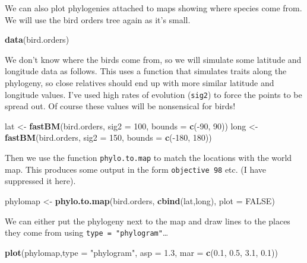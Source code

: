 \documentclass[]{book}
\newenvironment{Shaded}{\begin{snugshade}}{\end{snugshade}}
\newcommand{\KeywordTok}[1]{\textcolor[rgb]{0.13,0.29,0.53}{\textbf{{#1}}}}
\newcommand{\DataTypeTok}[1]{\textcolor[rgb]{0.13,0.29,0.53}{{#1}}}
\newcommand{\DecValTok}[1]{\textcolor[rgb]{0.00,0.00,0.81}{{#1}}}
\newcommand{\FloatTok}[1]{\textcolor[rgb]{0.00,0.00,0.81}{{#1}}}
\newcommand{\StringTok}[1]{\textcolor[rgb]{0.31,0.60,0.02}{{#1}}}
\newcommand{\OtherTok}[1]{\textcolor[rgb]{0.56,0.35,0.01}{{#1}}}
\newcommand{\NormalTok}[1]{{#1}}
\begin{document}
We can also plot phylogenies attached to maps showing where species come
from. We will use the bird orders tree again as it's small.

\begin{Shaded}
\begin{Highlighting}[]
\KeywordTok{data}\NormalTok{(bird.orders)}
\end{Highlighting}
\end{Shaded}

We don't know where the birds come from, so we will simulate some
latitude and longitude data as follows. This uses a function that
simulates traits along the phylogeny, so close relatives should end up
with more similar latitude and longitude values. I've used high rates of
evolution (\texttt{sig2}) to force the points to be spread out. Of
course these values will be nonsensical for birds!

\begin{Shaded}
\begin{Highlighting}[]
\NormalTok{lat <-}\StringTok{ }\KeywordTok{fastBM}\NormalTok{(bird.orders, }\DataTypeTok{sig2 =} \DecValTok{100}\NormalTok{, }\DataTypeTok{bounds =} \KeywordTok{c}\NormalTok{(-}\DecValTok{90}\NormalTok{, }\DecValTok{90}\NormalTok{))}
\NormalTok{long <-}\StringTok{ }\KeywordTok{fastBM}\NormalTok{(bird.orders, }\DataTypeTok{sig2 =} \DecValTok{150}\NormalTok{, }\DataTypeTok{bounds =} \KeywordTok{c}\NormalTok{(-}\DecValTok{180}\NormalTok{, }\DecValTok{180}\NormalTok{))}
\end{Highlighting}
\end{Shaded}

Then we use the function \texttt{phylo.to.map} to match the locations
with the world map. This produces some output in the form
\texttt{objective\ 98} etc. (I have suppressed it here).

\begin{Shaded}
\begin{Highlighting}[]
\NormalTok{phylomap <-}\StringTok{ }\KeywordTok{phylo.to.map}\NormalTok{(bird.orders, }\KeywordTok{cbind}\NormalTok{(lat,long), }\DataTypeTok{plot =} \OtherTok{FALSE}\NormalTok{)}
\end{Highlighting}
\end{Shaded}

We can either put the phylogeny next to the map and draw lines to the
places they come from using \texttt{type\ =\ "phylogram"}\ldots{}

\begin{Shaded}
\begin{Highlighting}[]
\KeywordTok{plot}\NormalTok{(phylomap,}\DataTypeTok{type =} \StringTok{"phylogram"}\NormalTok{, }\DataTypeTok{asp =} \FloatTok{1.3}\NormalTok{, }\DataTypeTok{mar =} \KeywordTok{c}\NormalTok{(}\FloatTok{0.1}\NormalTok{, }\FloatTok{0.5}\NormalTok{, }\FloatTok{3.1}\NormalTok{, }\FloatTok{0.1}\NormalTok{))}
\end{Highlighting}
\end{Shaded}
\end{document}
